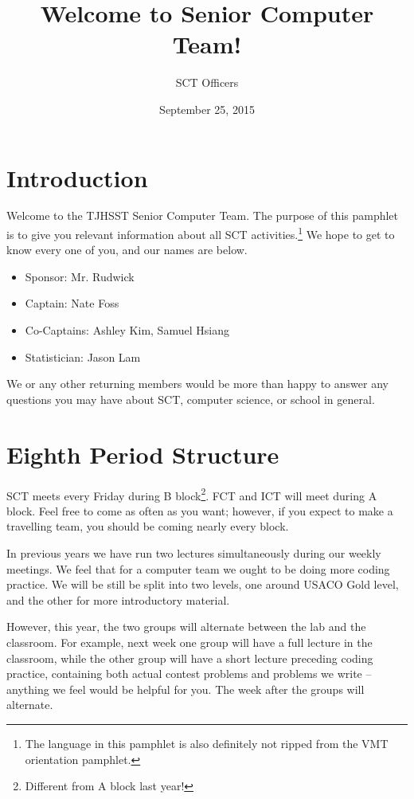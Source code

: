 \documentclass{article}
\title{Welcome to Senior Computer Team!}
\author{SCT Officers}
\date{September 25, 2015}
\begin{document}
\maketitle

\section{Introduction}

Welcome to the TJHSST Senior Computer Team. The purpose of this pamphlet is to give you relevant information about all SCT activities.\footnote{The language in this pamphlet is also definitely not ripped from the VMT orientation pamphlet.} We hope to get to know every one of you, and our names are below.
\begin{itemize}
	\item Sponsor: Mr. Rudwick
	\item Captain: Nate Foss
	\item Co-Captains: Ashley Kim, Samuel Hsiang
	\item Statistician: Jason Lam
\end{itemize}
We or any other returning members would be more than happy to answer any questions you may have about SCT, computer science, or school in general.

\section{Eighth Period Structure}

SCT meets every Friday during B block\footnote{Different from A block last year!}. FCT and ICT will meet during A block. Feel free to come as often as you want; however, if you expect to make a travelling team, you should be coming nearly every block.

In previous years we have run two lectures simultaneously during our weekly meetings. We feel that for a computer team we ought to be doing more coding practice. We will be still be split into two levels, one around USACO Gold level, and the other for more introductory material.

However, this year, the two groups will alternate between the lab and the classroom. For example, next week one group will have a full lecture in the classroom, while the other group will have a short lecture preceding coding practice, containing both actual contest problems and problems we write -- anything we feel would be helpful for you. The week after the groups will alternate.
\end{document}

